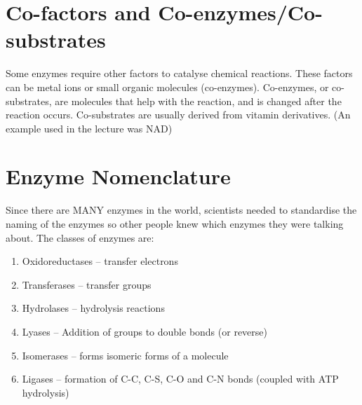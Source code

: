 \section{Co-factors and Co-enzymes/Co-substrates}

Some enzymes require other factors to catalyse chemical reactions.
These factors can be metal ions or small organic molecules (co-enzymes).
Co-enzymes, or co-substrates, are molecules that help with the reaction, and is changed after the reaction occurs.
Co-substrates are usually derived from vitamin derivatives.
(An example used in the lecture was NAD)

\section{Enzyme Nomenclature}

Since there are MANY enzymes in the world, scientists needed to standardise the naming of the enzymes so other people knew which enzymes they were talking about.
The classes of enzymes are:

\begin{enumerate}
\item Oxidoreductases -- transfer electrons
\item Transferases -- transfer groups
\item Hydrolases -- hydrolysis reactions
\item Lyases -- Addition of groups to double bonds (or reverse)
\item Isomerases -- forms isomeric forms of a molecule
\item Ligases -- formation of C-C, C-S, C-O and C-N bonds (coupled with ATP hydrolysis)
\end{enumerate}

